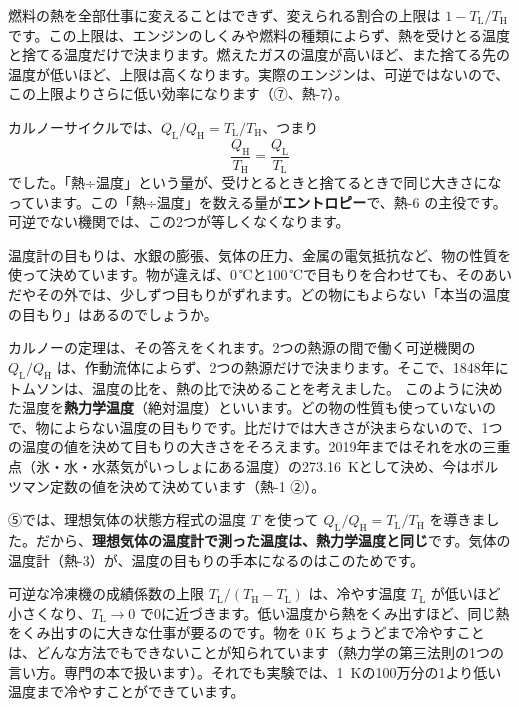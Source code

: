 燃料の熱を全部仕事に変えることはできず、変えられる割合の上限は $1-T_{\mathrm L}/T_{\mathrm H}$ です。この上限は、エンジンのしくみや燃料の種類によらず、熱を受けとる温度と捨てる温度だけで決まります。燃えたガスの温度が高いほど、また捨てる先の温度が低いほど、上限は高くなります。実際のエンジンは、可逆ではないので、この上限よりさらに低い効率になります（⑦、熱-7）。

カルノーサイクルでは、$Q_{\mathrm L}/Q_{\mathrm H}=T_{\mathrm L}/T_{\mathrm H}$、つまり
\[ \frac{Q_{\mathrm H}}{T_{\mathrm H}}=\frac{Q_{\mathrm L}}{T_{\mathrm L}} \]
でした。「熱÷温度」という量が、受けとるときと捨てるときで同じ大きさになっています。この「熱÷温度」を数える量が\textbf{エントロピー}で、熱-6 の主役です。可逆でない機関では、この2つが等しくなくなります。

\label{ph:熱-5:sec6}
温度計の目もりは、水銀の膨張、気体の圧力、金属の電気抵抗など、物の性質を使って決めています。物が違えば、0\,℃と100\,℃で目もりを合わせても、そのあいだやその外では、少しずつ目もりがずれます。どの物にもよらない「本当の温度の目もり」はあるのでしょうか。

カルノーの定理は、その答えをくれます。2つの熱源の間で働く可逆機関の $Q_{\mathrm L}/Q_{\mathrm H}$ は、作動流体によらず、2つの熱源だけで決まります。そこで、1848年にトムソンは、温度の比を、熱の比で決めることを考えました。
このように決めた温度を\textbf{熱力学温度}（絶対温度）といいます。どの物の性質も使っていないので、物によらない温度の目もりです。比だけでは大きさが決まらないので、1つの温度の値を決めて目もりの大きさをそろえます。2019年まではそれを水の三重点（氷・水・水蒸気がいっしょにある温度）の\qty{273.16}{K}として決め、今はボルツマン定数の値を決めて決めています（熱-1 ②）。

⑤では、理想気体の状態方程式の温度 $T$ を使って $Q_{\mathrm L}/Q_{\mathrm H}=T_{\mathrm L}/T_{\mathrm H}$ を導きました。だから、\textbf{理想気体の温度計で測った温度は、熱力学温度と同じ}です。気体の温度計（熱-3）が、温度の目もりの手本になるのはこのためです。

\begin{phmijika}[0\,K に届かないわけ]
可逆な冷凍機の成績係数の上限 $T_{\mathrm L}/(T_{\mathrm H}-T_{\mathrm L})$ は、冷やす温度 $T_{\mathrm L}$ が低いほど小さくなり、$T_{\mathrm L}\to0$ で0に近づきます。低い温度から熱をくみ出すほど、同じ熱をくみ出すのに大きな仕事が要るのです。物を 0\,K ちょうどまで冷やすことは、どんな方法でもできないことが知られています（熱力学の第三法則の1つの言い方。専門の本で扱います）。それでも実験では、\qty{1}{K}の100万分の1より低い温度まで冷やすことができています。
\end{phmijika}

